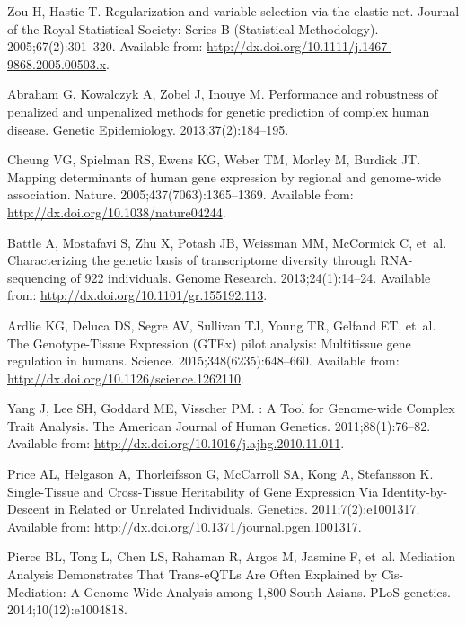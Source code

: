 \documentclass[10pt,letterpaper]{article}
\begin{document}
\begin{thebibliography}{10}
Zou H, Hastie T.
\newblock Regularization and variable selection via the elastic net.
\newblock Journal of the Royal Statistical Society: Series B (Statistical
  Methodology). 2005;67(2):301--320.
\newblock Available from:
  \url{http://dx.doi.org/10.1111/j.1467-9868.2005.00503.x}.

Abraham G, Kowalczyk A, Zobel J, Inouye M.
\newblock Performance and robustness of penalized and unpenalized methods for
  genetic prediction of complex human disease.
\newblock Genetic Epidemiology. 2013;37(2):184--195.

Cheung VG, Spielman RS, Ewens KG, Weber TM, Morley M, Burdick JT.
\newblock Mapping determinants of human gene expression by regional and
  genome-wide association.
\newblock Nature. 2005;437(7063):1365--1369.
\newblock Available from: \url{http://dx.doi.org/10.1038/nature04244}.

Battle A, Mostafavi S, Zhu X, Potash JB, Weissman MM, McCormick C, et~al.
\newblock Characterizing the genetic basis of transcriptome diversity through
  {RNA}-sequencing of 922 individuals.
\newblock Genome Research. 2013;24(1):14--24.
\newblock Available from: \url{http://dx.doi.org/10.1101/gr.155192.113}.

Ardlie KG, Deluca DS, Segre AV, Sullivan TJ, Young TR, Gelfand ET, et~al.
\newblock The Genotype-Tissue Expression ({GTEx}) pilot analysis: Multitissue
  gene regulation in humans.
\newblock Science. 2015;348(6235):648--660.
\newblock Available from: \url{http://dx.doi.org/10.1126/science.1262110}.

Yang J, Lee SH, Goddard ME, Visscher PM.
: A Tool for Genome-wide Complex Trait Analysis.
\newblock The American Journal of Human Genetics. 2011;88(1):76--82.
\newblock Available from: \url{http://dx.doi.org/10.1016/j.ajhg.2010.11.011}.

Price AL, Helgason A, Thorleifsson G, McCarroll SA, Kong A, Stefansson K.
\newblock Single-Tissue and Cross-Tissue Heritability of Gene Expression Via
  Identity-by-Descent in Related or Unrelated Individuals.
 Genetics. 2011;7(2):e1001317.
\newblock Available from: \url{http://dx.doi.org/10.1371/journal.pgen.1001317}.

Pierce BL, Tong L, Chen LS, Rahaman R, Argos M, Jasmine F, et~al.
\newblock Mediation Analysis Demonstrates That Trans-eQTLs Are Often Explained
  by Cis-Mediation: A Genome-Wide Analysis among 1,800 South Asians.
\newblock PLoS genetics. 2014;10(12):e1004818.


\end{thebibliography}
\end{document}
